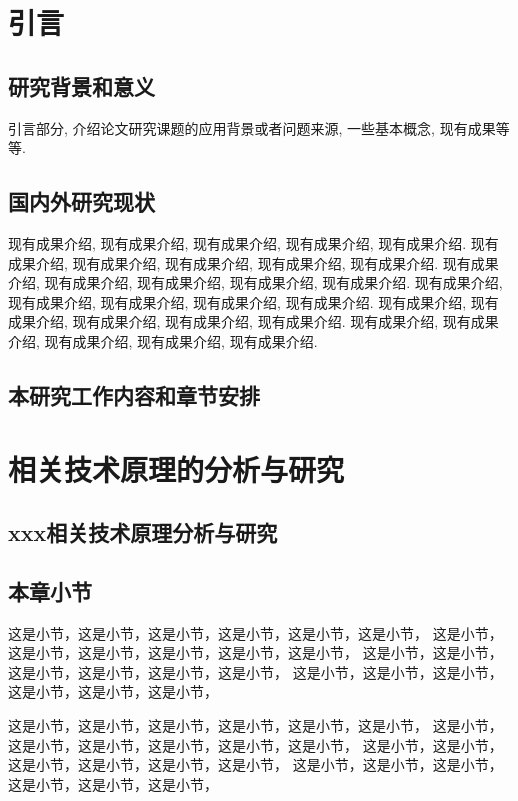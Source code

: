 \chapter{引言}
\section{研究背景和意义}


引言部分\cite{bi:hw-ml-challenges}, 介绍论文研究课题的应用背景或者问题来源,\cite{bi:hw-sw-co-design}
一些基本概念, 现有成果等等.


\section{国内外研究现状}


现有成果介绍, 现有成果介绍, 现有成果介绍, 现有成果介绍, 现有成果介绍.
现有成果介绍, 现有成果介绍, 现有成果介绍, 现有成果介绍, 现有成果介绍.
现有成果介绍, 现有成果介绍, 现有成果介绍, 现有成果介绍, 现有成果介绍.
现有成果介绍, 现有成果介绍, 现有成果介绍, 现有成果介绍, 现有成果介绍.
现有成果介绍, 现有成果介绍, 现有成果介绍, 现有成果介绍, 现有成果介绍.
现有成果介绍, 现有成果介绍, 现有成果介绍, 现有成果介绍, 现有成果介绍.

\section {本研究工作内容和章节安排}


\chapter {相关技术原理的分析与研究}


\section {xxx相关技术原理分析与研究}


\section {本章小节}


这是小节，这是小节，这是小节，这是小节，这是小节，这是小节，
这是小节，这是小节，这是小节，这是小节，这是小节，这是小节，
这是小节，这是小节，这是小节，这是小节，这是小节，这是小节，
这是小节，这是小节，这是小节，这是小节，这是小节，这是小节，

这是小节，这是小节，这是小节，这是小节，这是小节，这是小节，
这是小节，这是小节，这是小节，这是小节，这是小节，这是小节，
这是小节，这是小节，这是小节，这是小节，这是小节，这是小节，
这是小节，这是小节，这是小节，这是小节，这是小节，这是小节，

\clearpage %

